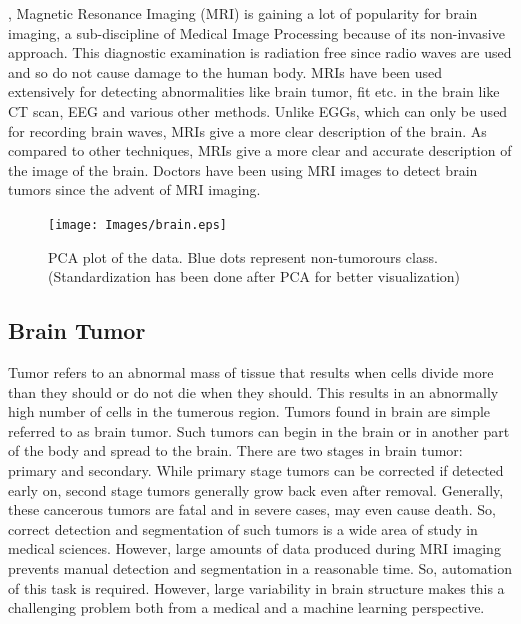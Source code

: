 \documentclass[journal]{IEEEtran}
\begin{document}
, Magnetic Resonance Imaging (MRI) is gaining a lot of popularity for brain imaging, a sub-discipline of Medical Image Processing because of its non-invasive approach. This diagnostic examination is radiation free since radio waves are used and so do not cause damage to the human body. MRIs have been used extensively for detecting abnormalities like brain tumor, fit etc. in the brain like CT scan, EEG and various other methods. Unlike EGGs, which can only be used for recording brain waves, MRIs give a more clear description of the brain. As compared to other techniques, MRIs give a more clear and accurate description of the image of the brain. Doctors have been using MRI images to detect brain tumors since the advent of MRI imaging.\cite{mrimachine}

\begin{figure}[h!]
	\begin{center}
		\texttt{[image: Images/brain.eps]}
		\caption{PCA plot of the data. Blue dots represent non-tumorours class. (Standardization has been done after PCA for better visualization)}
	\end{center}
\end{figure}

\subsection{Brain Tumor}
Tumor refers to an abnormal mass of tissue that results when cells divide more than they should or do not die when they should.\cite{tumordefinition} This results in an abnormally high number of cells in the tumerous region. Tumors found in brain are simple referred to as brain tumor. Such tumors can begin in the brain or in another part of the body and spread to the brain. There are two stages in brain tumor: primary and secondary. While primary stage tumors can be corrected if detected early on, second stage  tumors generally grow back even after removal.\cite{mrimachine} Generally, these cancerous tumors are fatal and in severe cases, may even cause death. So, correct detection and segmentation of such tumors is a wide area of study in medical sciences. However, large amounts of data produced during MRI imaging prevents manual detection and segmentation in a reasonable time. So, automation of this task is required. However, large variability in brain structure makes this a challenging problem both from a medical and a machine learning perspective.
\end{document}
